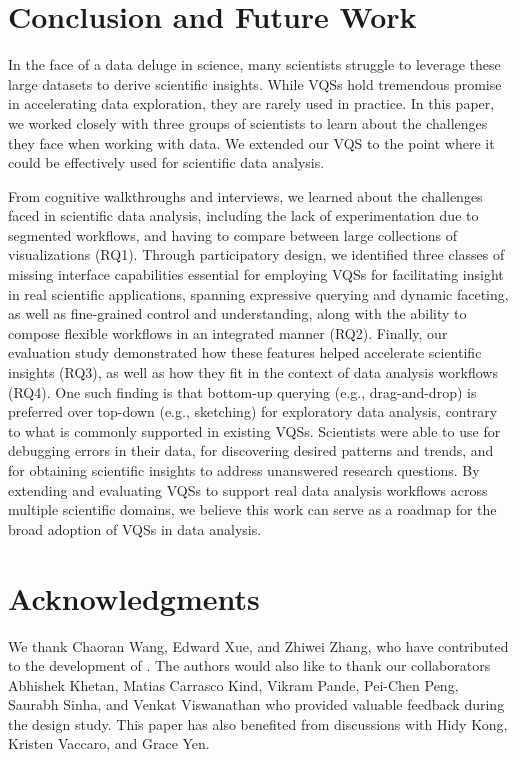 \section{Conclusion and Future Work \label{conclusion}} 
\par In the face of a data deluge in science, many scientists struggle to leverage these large datasets to derive scientific insights. While VQSs hold tremendous promise in accelerating data exploration, they are rarely used in practice. In this paper, we worked closely with three groups of scientists to learn about the challenges they face when working with data. We extended our VQS \zv to the point where it could be effectively used for scientific data analysis. 
\par From cognitive walkthroughs and interviews, we learned about the challenges faced in scientific data analysis, including the lack of experimentation due to segmented workflows, and having to compare between large collections of visualizations (RQ1). Through participatory design, we identified three classes of missing interface capabilities  essential for employing VQSs for facilitating insight in real scientific applications, spanning expressive querying and dynamic faceting, as well as fine-grained control and understanding, along with the ability to compose flexible workflows in an integrated manner (RQ2). Finally, our evaluation study demonstrated how these features helped accelerate scientific insights (RQ3), as well as how they fit in the context of data analysis workflows (RQ4). One such finding is that bottom-up querying (e.g., drag-and-drop) is preferred over top-down (e.g., sketching) for exploratory data analysis, contrary to what is commonly supported in existing VQSs. Scientists were able to use \zv for debugging errors in their data, for discovering desired patterns and trends, and for obtaining scientific insights to address unanswered research questions. By extending and evaluating VQSs to support real data analysis workflows across multiple scientific domains, we believe this work can serve as a roadmap for the broad adoption of VQSs in data analysis.
\newpage
\section{Acknowledgments}
\par We thank Chaoran Wang, Edward Xue, and Zhiwei Zhang, who have contributed to the development of \zv. The authors would also like to thank our collaborators Abhishek Khetan, Matias Carrasco Kind, Vikram Pande, Pei-Chen Peng, Saurabh Sinha, and Venkat Viswanathan who provided valuable feedback during the design study. This paper has also benefited from discussions with Hidy Kong, Kristen Vaccaro, and Grace Yen.